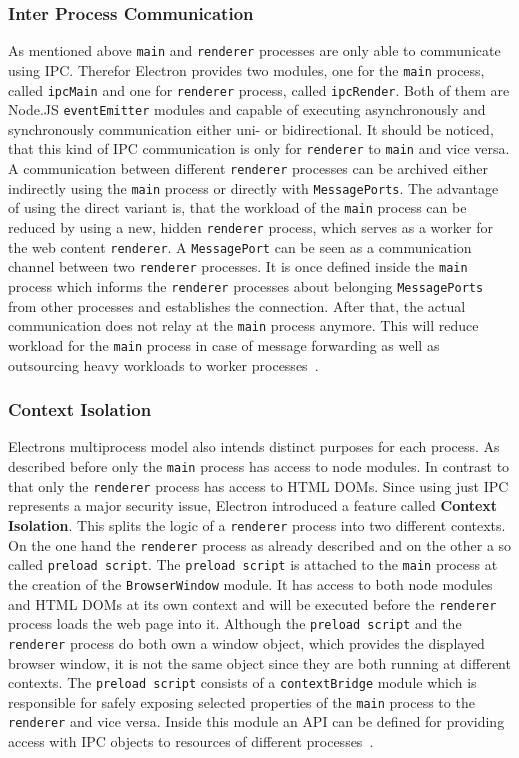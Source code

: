 \subsubsection{Inter Process Communication}
As mentioned above \texttt{main} and \texttt{renderer} processes are only able to communicate using \ac{IPC}.
Therefor Electron provides two modules, one for the \texttt{main} process, called \texttt{ipcMain} and one for \texttt{renderer} process, called \texttt{ipcRender}.
Both of them are Node.JS \texttt{eventEmitter} modules and capable of executing asynchronously and synchronously communication either uni- or bidirectional.
It should be noticed, that this kind of \ac{IPC} communication is only for \texttt{renderer} to \texttt{main} and vice versa.
A communication between different \texttt{renderer} processes can be archived either indirectly using the \texttt{main} process or directly with \texttt{MessagePorts}.
The advantage of using the direct variant is, that the workload of the \texttt{main} process can be reduced by using a new, hidden \texttt{renderer} process, which serves as a worker for the web content \texttt{renderer}.
A \texttt{MessagePort} can be seen as a communication channel between two \texttt{renderer} processes.
It is once defined inside the \texttt{main} process which informs the \texttt{renderer} processes about belonging \texttt{MessagePorts} from other processes and establishes the connection.
After that, the actual communication does not relay at the \texttt{main} process anymore.
This will reduce workload for the \texttt{main} process in case of message forwarding as well as outsourcing heavy workloads to worker processes~\cite{ElectronDoc}.
\subsubsection{Context Isolation}
Electrons multiprocess model also intends distinct purposes for each process.
As described before only the \texttt{main} process has access to node modules.
In contrast to that only the \texttt{renderer} process has access to \ac{HTML} \ac{DOM}s.
Since using just \ac{IPC} represents a major security issue, Electron introduced a feature called \textbf{Context Isolation}.
This splits the logic of a \texttt{renderer} process into two different contexts.
On the one hand the \texttt{renderer} process as already described and on the other a so called \texttt{preload script}.
The \texttt{preload script} is attached to the \texttt{main} process at the creation of the \texttt{BrowserWindow} module.
It has access to both node modules and \ac{HTML} \ac{DOM}s at its own context and will be executed before the \texttt{renderer} process loads the web page into it.
Although the \texttt{preload script} and the \texttt{renderer} process do both own a window object, which provides the displayed browser window, it is not the same object since they are both running at
different contexts.
The \texttt{preload script} consists of a \texttt{contextBridge} module which is responsible for safely exposing selected properties of the \texttt{main} process to the \texttt{renderer} and vice versa.
Inside this module an \ac{API} can be defined for providing access with \ac{IPC} objects to resources of different processes~\cite{ElectronDoc}.

